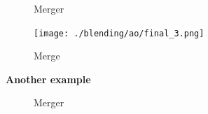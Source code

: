 \documentclass{article}
\begin{document}
    \begin{figure}[!htb]
      \caption{Merger}
    \endminipage \hfill
      \texttt{[image: ./blending/ao/final\_3.png]}
      \caption{Merge}
    \endminipage \hfill
    \end{figure}
    
    \pagebreak
    \textbf{Another example}
    
    \begin{figure}[!htb]
      \caption{Merger}
    \endminipage \hfill

\end{figure}
\end{document}

